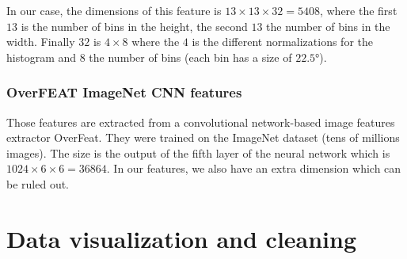 \documentclass{article} %
\begin{document}
In our case, the dimensions of this feature is $13 \times 13 \times 32=5408$, where the first $13$ is the number of bins in the height, the second $13$ the number of bins in the width. Finally $32$ is $4 \times 8$ where the $4$ is the different normalizations for the histogram and $8$ the number of bins (each bin has a size of $22.5°$). 

\subsubsection{OverFEAT ImageNet CNN features}

Those features are extracted from a convolutional network-based image features extractor OverFeat. They were trained on the ImageNet dataset (tens of millions images). The size is the output of the fifth layer of the neural network which is $1024 \times 6 \times 6 = 36864$. In our features, we also have an extra dimension which can be ruled out.

\section{Data visualization and cleaning}
\end{document}
